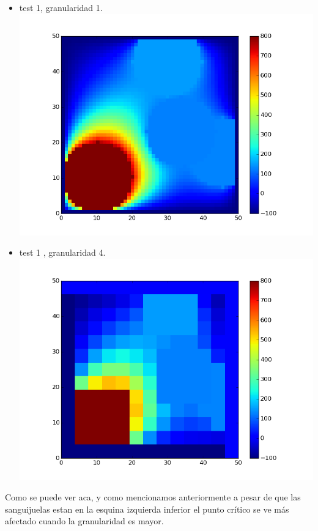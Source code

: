 \begin{itemize}
 \item test 1, granularidad 1.\\
  \includegraphics[width=400pt]{imagenes/testpropios/test11.png}

 \item test 1 , granularidad 4.\\
  \includegraphics[width=400pt]{imagenes/testpropios/test14.png}
\end{itemize}

Como se puede ver aca, y como mencionamos anteriormente a pesar de que las sanguijuelas estan en la esquina izquierda inferior el punto crítico se ve más afectado cuando la granularidad es mayor.

